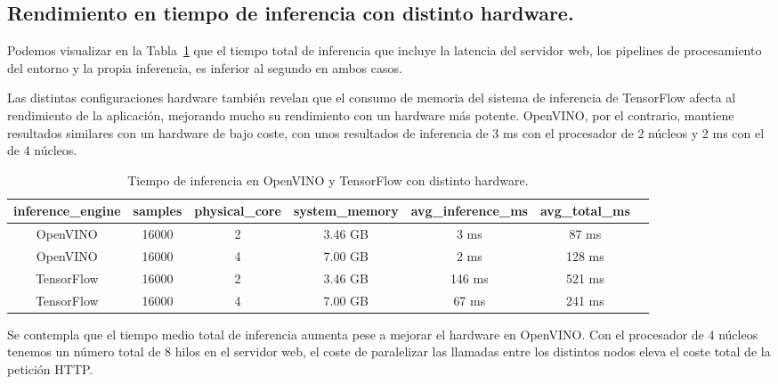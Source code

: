 \subsection{Rendimiento en tiempo de inferencia con distinto hardware.}
Podemos visualizar en la Tabla~\ref{tab:Comparativa de tiempo de inferencia con OpenVINO y TensorFlow con distinto hardware} que el tiempo total de inferencia que incluye la latencia del servidor web, los pipelines de procesamiento del entorno y la propia inferencia, es inferior al segundo en ambos casos.


Las distintas configuraciones hardware también revelan que el consumo de memoria del sistema de inferencia de TensorFlow afecta al rendimiento de la aplicación, mejorando mucho su rendimiento con un hardware más potente.
OpenVINO, por el contrario, mantiene resultados similares con un hardware de bajo coste, con unos resultados de inferencia de 3 ms con el procesador de 2 núcleos y 2 ms con el de 4 núcleos.

\begin{table}[ht]
    \footnotesize
    \begin{center}
        \begin{tabular}{| c | c | c | c | c | c | c |}
            \hline
            inference\_engine & samples & physical\_core & system\_memory & avg\_inference\_ms & avg\_total\_ms \\ \hline
            OpenVINO & 16000 & 2 & 3.46 GB & 3 ms & 87 ms \\
            OpenVINO & 16000 & 4 & 7.00 GB & 2 ms & 128 ms \\
            TensorFlow & 16000 & 2 & 3.46 GB & 146 ms & 521 ms \\
            TensorFlow & 16000 & 4 & 7.00 GB & 67 ms & 241 ms \\ \hline
        \end{tabular}
        \caption{Tiempo de inferencia en OpenVINO y TensorFlow con distinto hardware.}
        \label{tab:Comparativa de tiempo de inferencia con OpenVINO y TensorFlow con distinto hardware}
    \end{center}
\end{table}

Se contempla que el tiempo medio total de inferencia aumenta pese a mejorar el hardware en OpenVINO.
Con el procesador de 4 núcleos tenemos un número total de 8 hilos en el servidor web, el coste de paralelizar las llamadas entre los distintos nodos eleva el coste total de la petición HTTP.

